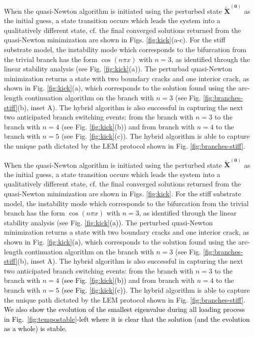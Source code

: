 When the quasi-Newton algorithm is initiated using the perturbed state \(\mathbf{\tilde X^{(0)}}\)
as the initial guess, {a state transition} occurs which leads the system into a qualitatively different state, cf. the final  converged solutions returned from the quasi-Newton minimization are shown in Figs. \ref{fig:kick}(a-c). For the stiff substrate model, the {instability mode} which corresponds to the bifurcation from the trivial branch has the form \(\cos(n\pi x)\) with \(n=3\), as identified through the linear stability analysis (see Fig. \ref{fig:kick}(a)). 
The perturbad quasi-Newton minimization returns a state with two boundary cracks and one interior crack, as shown in Fig. \ref{fig:kick}(a), which corresponds to the solution found using the arc-length continuation algorithm on the branch with \(n=3\) (see Fig. \ref{fig:branches-stiff}(b), inset A).  The hybrid algorithm is also successful in capturing the next two anticipated branch   switching events: from the  branch with \(n=3\)  to the branch  with \(n=4\) (see Fig. \ref{fig:kick}(b)) and  from branch with \(n=4\)  to the branch  with \(n=5\) (see Fig. \ref{fig:kick}(c)). The hybrid algorithm is able to capture the unique path dictated by the LEM protocol shown in Fig. \ref{fig:branches-stiff}.   

When the quasi-Newton algorithm is initiated using the perturbed state \(\mathbf{\tilde X^{(0)}}\) as the initial guess, {a state transition} occurs which leads the system into a qualitatively different state, cf. the final  converged solutions returned from the quasi-Newton minimization are shown in  Figs. \ref{fig:kick}. For the stiff substrate model, the {instability mode} which corresponds to the bifurcation from the trivial branch has the form \(\cos(n\pi x)\) with \(n=3\), as identified through the linear stability analysis (see Fig. \textcolor{black}{\ref{fig:kick}(a))}. 
The perturbed quasi-Newton minimization returns a state with two boundary cracks and one interior crack, as shown in Fig. \textcolor{black}{\ref{fig:kick}(a)}, which corresponds to the solution found using the arc-length continuation algorithm on the branch with \(n=3\) (see Fig. \ref{fig:branches-stiff}(b), inset A).  The hybrid algorithm is also successful in capturing the next two anticipated branch   switching events: from the  branch with \(n=3\)  to the branch  with \(n=4\) \textcolor{black}{(see Fig. \ref{fig:kick}(b))} and  from branch with \(n=4\)  to the branch  with \(n=5\)  \textcolor{black}{(see Fig. \ref{fig:kick}(c))}. The hybrid algorithm is able to capture the unique path dictated by the LEM protocol shown in Fig. \ref{fig:branches-stiff}.   \textcolor{black}{We also show the evolution of the smallest eigenvalue during all loading process in Fig.~\ref{fig:tempostable}-left where  it is clear that  the solution (and the evolution as a whole) is stable.}

